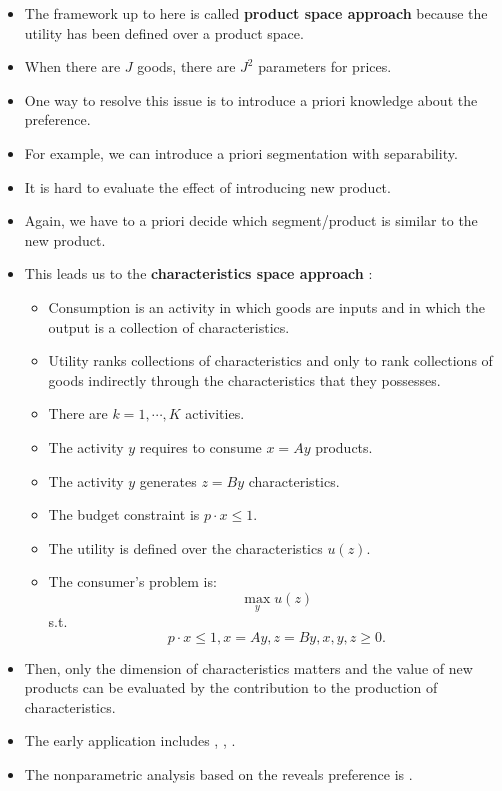 \documentclass[
]{book}
\providecommand{\tightlist}{%
  \setlength{\itemsep}{0pt}\setlength{\parskip}{0pt}}
\begin{document}
\begin{itemize}
\tightlist
\item
  The framework up to here is called \textbf{product space approach} because the utility has been defined over a product space.
\item
  When there are \(J\) goods, there are \(J^2\) parameters for prices.
\item
  One way to resolve this issue is to introduce a priori knowledge about the preference.
\item
  For example, we can introduce a priori segmentation with separability.
\item
  It is hard to evaluate the effect of introducing new product.
\item
  Again, we have to a priori decide which segment/product is similar to the new product.
\item
  This leads us to the \textbf{characteristics space approach} \citep{Lancaster1966, Muth1966}:

  \begin{itemize}
  \tightlist
  \item
    Consumption is an activity in which goods are inputs and in which the output is a collection of characteristics.
  \item
    Utility ranks collections of characteristics and only to rank collections of goods indirectly through the characteristics that they possesses.
  \item
    There are \(k = 1, \cdots, K\) activities.
  \item
    The activity \(y\) requires to consume \(x = A y\) products.
  \item
    The activity \(y\) generates \(z = B y\) characteristics.
  \item
    The budget constraint is \(p \cdot x \le 1\).
  \item
    The utility is defined over the characteristics \(u(z)\).
  \item
    The consumer's problem is:
    \[
      \max_y u(z)
      \]
    s.t.
    \[
      p \cdot x \le 1, x = Ay, z = By, x, y, z \ge 0.
      \]
  \end{itemize}
\item
  Then, only the dimension of characteristics matters and the value of new products can be evaluated by the contribution to the production of characteristics.
\item
  The early application includes \citet{Rosen1974}, \citet{Muellbauer1974}, \citet{Gorman1980}.
\item
  The nonparametric analysis based on the reveals preference is \citet{Blow2008}.
\end{itemize}
\end{document}
